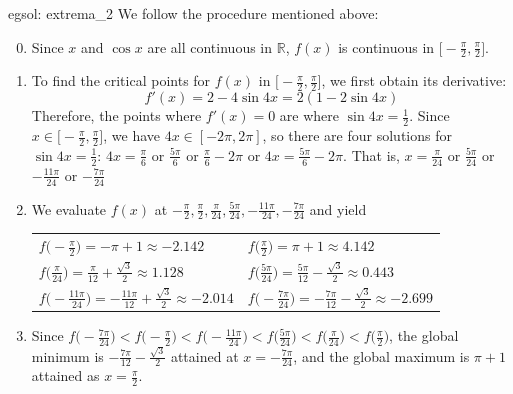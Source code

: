 \begin{egsol}[]{egsol: extrema_2}
    We follow the procedure mentioned above:
    \begin{enumerate}
        \setcounter{enumi}{-1}
        \item Since $x$ and $\cos x$ are all continuous in $\mathbb{R}$, $f(x)$ is continuous in $\big[-\frac{\pi}{2}, \frac{\pi}{2}\big]$.
        \item To find the critical points for $f(x)$ in $\big[-\frac{\pi}{2}, \frac{\pi}{2}\big]$, we first obtain its derivative:
        \[f'(x) = 2-4 \sin 4x = 2(1 - 2 \sin 4x)\]
        Therefore, the points where $f'(x) = 0$ are where $\sin 4x = \frac{1}{2}$.  Since $x \in \big[-\frac{\pi}{2}, \frac{\pi}{2}\big]$, we have $4x \in [-2\pi, 2\pi]$, so there are four solutions for $\sin 4x = \frac{1}{2}$: $4x = \frac{\pi}{6}$ or $\frac{5\pi}{6}$ or $\frac{\pi}{6}-2\pi$ or $4x = \frac{5\pi}{6} - 2\pi$.  That is, $x = \frac{\pi}{24}$ or $\frac{5\pi}{24}$ or $-\frac{11\pi}{24}$ or $-\frac{7\pi}{24}$
        \item We evaluate $f(x)$ at $-\frac{\pi}{2}, \frac{\pi}{2}, \frac{\pi}{24}, \frac{5\pi}{24}, -\frac{11\pi}{24}, -\frac{7\pi}{24}$ and yield
        
        \begin{center}
            \begin{tabular}{ll}
                $f\big(-\frac{\pi}{2}\big) = -\pi+1 \approx -2.142$ &  $f\big(\frac{\pi}{2}\big) = \pi+1 \approx 4.142$\\
                $f\big(\frac{\pi}{24}\big) = \frac{\pi}{12} + \frac{\sqrt{3}}{2} \approx 1.128$ & $f\big(\frac{5\pi}{24}\big) = \frac{5\pi}{12} - \frac{\sqrt{3}}{2} \approx 0.443$\\
                $f\big(-\frac{11\pi}{24}\big) = -\frac{11\pi}{12} + \frac{\sqrt{3}}{2} \approx -2.014$ & $ f\big(-\frac{7\pi}{24}\big) = -\frac{7\pi}{12} - \frac{\sqrt{3}}{2} \approx -2.699$
            \end{tabular}
        \end{center}
        \item Since $f\big(-\frac{7\pi}{24}\big) < f\big(-\frac{\pi}{2}\big) < f\big(-\frac{11\pi}{24}\big) < f\big(\frac{5\pi}{24}\big) < f\big(\frac{\pi}{24}\big) < f\big(\frac{\pi}{2}\big)$, the global minimum is $-\frac{7\pi}{12} - \frac{\sqrt{3}}{2}$ attained at $x=-\frac{7\pi}{24}$, and the global maximum is $\pi+1 $ attained as $x = \frac{\pi}{2}$.
    \end{enumerate}
\end{egsol}

